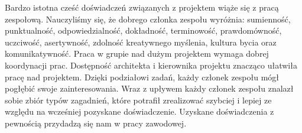 Bardzo istotna cześć doświadczeń związanych z projektem wiąże się z pracą zespołową.
Nauczyliśmy się, że dobrego członka zespołu wyróżnia: sumienność, punktualność, odpowiedzialność, dokładność, terminowość, prawdomówność, uczciwość, asertywność, zdolność kreatywnego myślenia, kultura bycia oraz komunikatywność. Praca w grupie nad dużym projektem wymaga dobrej koordynacji prac. Dostępność architekta i kierownika projektu znacząco ułatwiła pracę nad projektem. Dzięki podziałowi zadań, każdy członek zespołu mógł pogłębić swoje zainteresowania. Wraz z upływem każdy członek zespołu znalazł sobie zbiór typów zagadnień, które potrafił zrealizować szybciej i lepiej ze względu na wcześniej pozyskane doświadczenie. Uzyskane doświadczenia z pewnością przydadzą się nam w pracy zawodowej.

